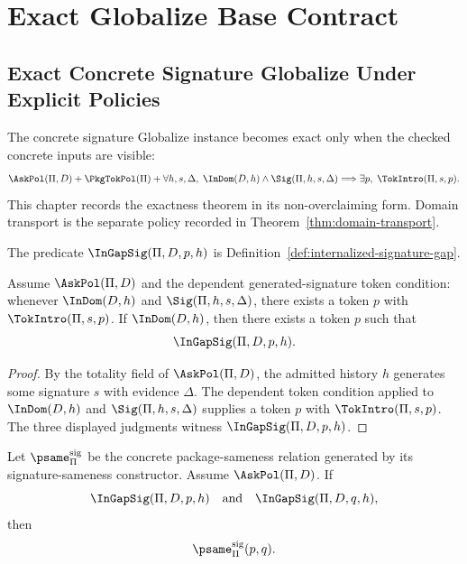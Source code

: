 \chapter{Exact Globalize Base Contract}
\label{ch:proof-obligations-exact-globalize}

\section{Exact Concrete Signature Globalize Under Explicit Policies}
\label{sec:po-exact-concrete-globalize-policy}

The concrete signature Globalize instance becomes exact only when the checked concrete inputs are visible:
$$
  \AskPol(\Pi,D)
  +
  \PkgTokPol(\Pi)
  +
  \forall h,s,\Delta,\;
  \InDom(D,h)\wedge\Sig(\Pi,h,s,\Delta)
  \Longrightarrow
  \exists p,\;\TokIntro(\Pi,s,p).
$$
This chapter records the exactness theorem in its non-overclaiming form. Domain transport is the separate policy recorded in Theorem~\ref{thm:domain-transport}.

The predicate $\InGapSig(\Pi,D,p,h)$ is Definition~\ref{def:internalized-signature-gap}.

\begin{theorem}
\label{thm:gap-coverage-globalize}
Assume $\AskPol(\Pi,D)$ and the dependent generated-signature token condition: whenever $\InDom(D,h)$ and $\Sig(\Pi,h,s,\Delta)$, there exists a token $p$ with $\TokIntro(\Pi,s,p)$. If $\InDom(D,h)$, then there exists a token $p$ such that
$$
  \InGapSig(\Pi,D,p,h).
$$
\end{theorem}

\begin{proof}
By the totality field of $\AskPol(\Pi,D)$, the admitted history $h$ generates some signature $s$ with evidence $\Delta$. The dependent token condition applied to $\InDom(D,h)$ and $\Sig(\Pi,h,s,\Delta)$ supplies a token $p$ with $\TokIntro(\Pi,s,p)$. The three displayed judgments witness $\InGapSig(\Pi,D,p,h)$.
\end{proof}

\begin{theorem}
\label{thm:concrete-gap-separation}
\label{thm:gap-separation-globalize}
Let \(\psame_{\Pi}^{\mathrm{sig}}\) be the concrete package-sameness relation generated by its signature-sameness constructor. Assume \(\AskPol(\Pi,D)\). If
$$
  \InGapSig(\Pi,D,p,h)
  \quad\text{and}\quad
  \InGapSig(\Pi,D,q,h),
$$
then
$$
  \psame_{\Pi}^{\mathrm{sig}}(p,q).
$$
\end{theorem}

